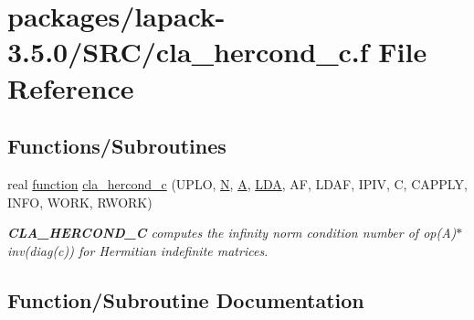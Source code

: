 \hypertarget{cla__hercond__c_8f}{}\section{packages/lapack-\/3.5.0/\+S\+R\+C/cla\+\_\+hercond\+\_\+c.f File Reference}
\label{cla__hercond__c_8f}
\subsection*{Functions/\+Subroutines}
\begin{DoxyCompactItemize}
\item 
real \hyperlink{afunc_8m_a7b5e596df91eadea6c537c0825e894a7}{function} \hyperlink{cla__hercond__c_8f_afb20032f889fa17495f6d52f8943015f}{cla\+\_\+hercond\+\_\+c} (U\+P\+L\+O, \hyperlink{polmisc_8c_a0240ac851181b84ac374872dc5434ee4}{N}, \hyperlink{classA}{A}, \hyperlink{example__user_8c_ae946da542ce0db94dced19b2ecefd1aa}{L\+D\+A}, A\+F, L\+D\+A\+F, I\+P\+I\+V, C, C\+A\+P\+P\+L\+Y, I\+N\+F\+O, W\+O\+R\+K, R\+W\+O\+R\+K)
\begin{DoxyCompactList}\small\item\em {\bfseries C\+L\+A\+\_\+\+H\+E\+R\+C\+O\+N\+D\+\_\+\+C} computes the infinity norm condition number of op(\+A)$\ast$inv(diag(c)) for Hermitian indefinite matrices. \end{DoxyCompactList}\end{DoxyCompactItemize}


\subsection{Function/\+Subroutine Documentation}
\hypertarget{cla__hercond__c_8f_afb20032f889fa17495f6d52f8943015f}{}
